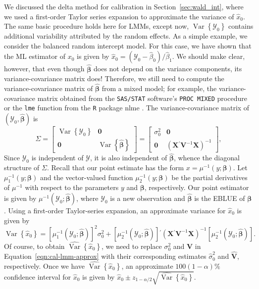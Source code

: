 \documentclass[cmfont,usenames,dvipsnames,leqno]{afit-etd}\usepackage[]{graphicx}\usepackage[]{color}
\newcommand{\code}[1]{\texttt{\small{#1}}}
\newcommand{\pkg}[1]{\textsf{\small{#1}}}
\newcommand{\trans}{\ensuremath{^\prime}}
\newcommand{\bc}[1]{\ensuremath{\bm{\mathcal{#1}}}}
\newcommand{\mc}[1]{\ensuremath{\mathcal{#1}}}
\newcommand{\wh}[1]{\ensuremath{\widehat{#1}}}
\newcommand{\var}{\operatorname{Var}}
\newcommand{\X}{\ensuremath{\bm{X}}}
\begin{document}
We discussed the delta method for calibration in Section~\ref{sec:wald_int}, where we used a first-order Taylor series expansion to approximate the variance of $\wh{x}_0$. The same basic procedure holds here for LMMs, except now, $\var\left\{\mc{Y}_0\right\}$ contains additional variability attributed by the random effects. As a simple example, we consider the balanced random intercept model. For this case, we have shown that the \ac{ML} estimator of $x_0$ is given by $\wh{x}_0 = \left(\mc{Y}_0 - \wh{\beta}_0\right)/\wh{\beta}_1$. We should make clear, however, that even though $\wh{\bm{\beta}}$ does not depend on the variance components, its variance-covariance matrix does! Therefore, we still need to compute the variance-covariance matrix of $\wh{\bm{\beta}}$ from a mixed model; for example, the variance-covariance matrix obtained from the \code{SAS/STAT} \citep{sas_program} software's \code{PROC MIXED} procedure or the \code{lme} function from the \code{R} package \pkg{nlme} \citep{pinheiro_nlme_2013}. The variance-covariance matrix of $\left(\mc{Y}_0, \wh{\bm{\beta}}\right)$ is
\begin{equation}
\label{eqn:Sigma}
\Sigma = \begin{bmatrix}
           \var\left\{\mc{Y}_0\right\} & \bm{0} \\
           \bm{0} & \var\left\{\wh{\bm{\beta}}\right\}
         \end{bmatrix} = \begin{bmatrix}
           \sigma_0^2 & \bm{0} \\
           \bm{0} & \left(\X\trans\bm{V}^{-1}\X\right)^{-1}
         \end{bmatrix},
\end{equation} 
Since $\mc{Y}_0$ is independent of $\bc{Y}$, it is also independent of $\wh{\bm{\beta}}$, whence the diagonal structure of $\Sigma$. Recall that our point estimate has the form $x = \mu^{-1}\left(y; \bm{\beta}\right)$. Let $\mu_1^{-1}\left(y; \bm{\beta}\right)$ and the vector-valued function $\mu_2^{-1}\left(y; \bm{\beta}\right)$ be the partial derivatives of $\mu^{-1}$ with respect to the parameters $y$ and $\bm{\beta}$, respectively. Our point estimator is given by $\mu^{-1}\left(\mc{Y}_0; \wh{\bm{\beta}}\right)$, where $\mc{Y}_0$ is a new observation and $\wh{\bm{\beta}}$ is the \ac{EBLUE} of $\bm{\beta}$. Using a first-order Taylor-series expansion, an approximate variance for $\wh{x}_0$ is given by
\begin{equation}
\label{eqn:cal-lmm-approx}
  \var\left\{\wh{x}_0\right\} = \left[\mu_1^{-1}\left(\mc{Y}_0; \wh{\bm{\beta}}\right)\right]^2\sigma_0^2 + \left[\mu_2^{-1}\left(\mc{Y}_0; \wh{\bm{\beta}}\right)\right]\trans\left(\X\trans\bm{V}^{-1}\X\right)^{-1}\left[\mu_2^{-1}\left(\mc{Y}_0; \wh{\bm{\beta}}\right)\right].
\end{equation}
Of course, to obtain $\wh{\var}\left\{\wh{x}_0\right\}$, we need to replace $\sigma_0^2$ and $\bm{V}$ in Equation~\eqref{eqn:cal-lmm-approx} with their corresponding estimates $\wh{\sigma}_0^2$ and $\wh{\bm{V}}$, respectively. Once we have $\wh{\var}\left\{\wh{x}_0\right\}$, an approximate $100(1-\alpha)\%$ confidence interval for $\wh{x}_0$ is given by $\wh{x}_0 \pm z_{1-\alpha/2}\sqrt{\wh{\var}\left\{\wh{x}_0\right\}}$.
\end{document}
